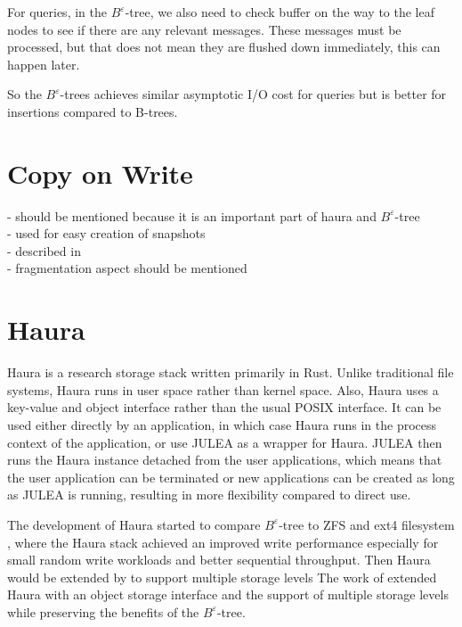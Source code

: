 \documentclass[
	12pt,
	a4paper,
	abstract,
	bibliography=totoc,
	chapterprefix,
	headings=openright,
	numbers=endperiod,
	parskip=half,
	twoside,
]{scrreprt}
\begin{document}
For queries, in the $B^{\varepsilon}$-tree, we also need to check buffer on the way to the leaf nodes to see if there are any relevant messages.
These messages must be processed, but that does not mean they are flushed down immediately, this can happen later.

So the $B^{\varepsilon}$-trees achieves similar asymptotic I/O cost for queries but is better for insertions compared to B-trees.

\section{Copy on Write}
\label{sec:copy on write}

- should be mentioned because it is an important part of haura and $B^{\varepsilon}$-tree\\
- used for easy creation of snapshots \\
- described in \cite{patterson1995informed}\\
- fragmentation aspect should be mentioned\\ 

\section{Haura}
\label{sec:haura}

Haura is a research storage stack written primarily in Rust.
Unlike traditional file systems, Haura runs in user space rather than kernel space.
Also, Haura uses a key-value and object interface rather than the usual POSIX interface.
It can be used either directly by an application, in which case Haura runs in the process context of the application, or
use JULEA as a wrapper for Haura.
JULEA then runs the Haura instance detached from the user applications, which means that the user application can be terminated or new applications can be created as long as JULEA is running, resulting in more flexibility compared to direct use.


The development of Haura started to compare $B^{\varepsilon}$-tree to ZFS and ext4 filesystem \cite{wiedemann2018modern}, where the Haura stack
achieved an improved write performance especially for small random write workloads and better sequential throughput.
Then Haura would be extended by \cite{hoppner2021design} to support multiple storage levels
The work of \cite{hoppner2021design} extended Haura with an object storage interface and the support of multiple storage levels while preserving the benefits of the $B^{\varepsilon}$-tree.
\end{document}
